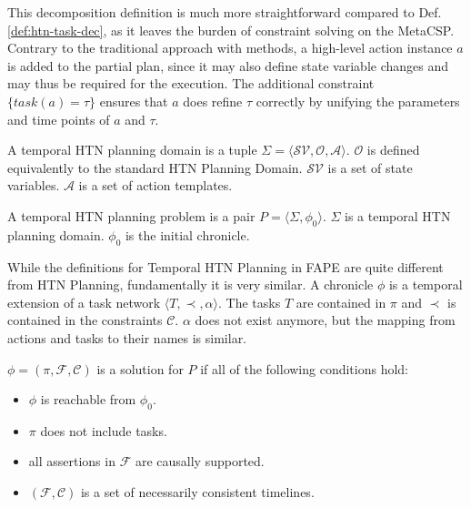This decomposition definition is much more straightforward compared to Def. \ref{def:htn-task-dec}, as it leaves the burden of constraint solving on the MetaCSP.
Contrary to the traditional approach with methods, a high-level action instance $a$ is added to the partial plan, since it may also define state variable changes and may thus be required for the execution.
The additional constraint $\{task(a) = \tau\}$ ensures that $a$ does refine $\tau$ correctly by unifying the parameters and time points of $a$ and $\tau$.

\begin{definition}
  A temporal HTN planning domain is a tuple $\Sigma = \langle \mathcal{SV},\mathcal{O},\mathcal{A} \rangle$.
  $\mathcal{O}$ is defined equivalently to the standard HTN Planning Domain.
  $\mathcal{SV}$ is a set of state variables.
  $\mathcal{A}$ is a set of action templates.
\end{definition}

\begin{definition}
  A temporal HTN planning problem is a pair $P = \langle \Sigma, \phi_0 \rangle$.
  $\Sigma$ is a temporal HTN planning domain.
  $\phi_0$ is the initial chronicle.
\end{definition}

While the definitions for Temporal HTN Planning in FAPE are quite different from HTN Planning, fundamentally it is very similar.
A chronicle $\phi$ is a temporal extension of a task network $\langle T,\prec,\alpha \rangle$.
The tasks $T$ are contained in $\pi$ and $\prec$ is contained in the constraints $\mathcal{C}$.
$\alpha$ does not exist anymore, but the mapping from actions and tasks to their names is similar.


\begin{definition}
  $\phi = (\pi,\mathcal{F},\mathcal{C})$ is a solution for $P$ if all of the following conditions hold:
  \begin{itemize}
    \item $\phi$ is reachable from $\phi_0$.
    \item $\pi$ does not include tasks.
    \item all assertions in $\mathcal{F}$ are causally supported.
    \item $(\mathcal{F},\mathcal{C})$ is a set of necessarily consistent timelines.
  \end{itemize}
\end{definition}

